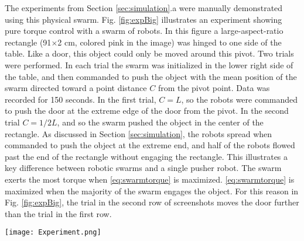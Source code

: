 The experiments from Section \ref{sec:simulation}.a were manually demonstrated using this physical swarm.
Fig. \ref{fig:expBig} illustrates an experiment showing pure torque control with a swarm of robots. In this figure a large-aspect-ratio rectangle  (91$\times$2 cm, colored pink in the image) was hinged to one side of the table.  Like a door, this object could only be moved around this pivot. 
Two trials were performed.  In each trial the swarm was initialized in the lower right side of the table, and then commanded to push the object with the mean position of the swarm directed toward a point distance $C$ from the pivot point. Data was recorded for 150 seconds.
In the first trial, $C = L$, so the robots were commanded to push the door at the extreme edge of the door from the pivot.  
In the second trial $C = 1/2 L$, and so the swarm pushed the object in the center of the rectangle.
As discussed in Section \ref{sec:simulation}, the robots spread when commanded to push the object at the extreme end, and half of the robots flowed past the end of the rectangle without engaging the rectangle.
 This illustrates a key difference between robotic swarms and a single pusher robot. The swarm exerts the most torque when  \eqref{eq:swarmtorque} is maximized.
  \eqref{eq:swarmtorque} is maximized when the majority of the swarm engages the object.
For this reason in Fig. \ref{fig:expBig}, the trial in the second row of screenshots moves the door further than the  trial in the  first row.
\begin{figure*}
\centering

\texttt{[image: Experiment.png]}
\vspace{-1em}
\caption{\label{fig:expBig}{Snapshots showing the effect of pushing a pivoted rectangular object at different distances from the pivot point. 
 97 robots were programmed to move toward the brightest light in the room, and   controlled by choosing which of 8 lights were on at any given instant. The top row of snapshots illustrate the swarm pushing at the end of the object.  In this case,  the swarm flows past the object and the force decreases. The bottom row illustrates that when the swarm pushes at the middle of the object the force provided by the swarm remains constant. In this case the swarm does not flow past the object. See video attachment for recordings of these experiments at\href{https://www.youtube.com/watch?v=ZiKEa5UwukM&feature=youtu.be}{\cite{ShahrokhiTorqueVideo}}.
 }
}
\end{figure*}






